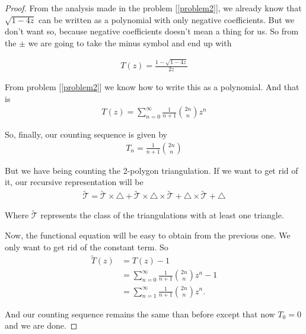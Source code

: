 \begin{proof}
    From the analysis made in the problem [\ref{problem2}], we already know that $\sqrt{1 - 4z}$ can be written as a polynomial with only
    negative coefficients. But we don't want so, because negative coefficients doesn't mean a thing for us. So from the $\pm$ we are going to
    take the minus symbol and end up with
    
    \begin{align}
        T(z) = \frac{1 - \sqrt{1 - 4z}}{2z}    
    \end{align}\pn
    
    From problem [\ref{problem2}] we know how to write this as a polynomial. And that is
    \begin{align}
            T(z) = \sum_{n=0}^{\infty} \frac{1}{n+1} \binom{2n}{n} z^n
    \end{align}\pn
    
    So, finally, our counting sequence is given by
    \begin{align}
            T_n = \frac{1}{n+1} \binom{2n}{n}
    \end{align}\pn
    
    But we have being counting the 2-polygon triangulation. If we want to get rid of it, our recursive representation will be
    \begin{align}
        \tilde{\mathcal{T}} = \tilde{\mathcal{T}} \times \triangle + \tilde{\mathcal{T}} \times \triangle \times \tilde{\mathcal{T}} + \triangle \times \tilde{\mathcal{T}} + \triangle
    \end{align}\pn
    
    Where $\tilde{\mathcal{T}}$ represents the class of the triangulations with at least one triangle.\pn
    
    Now, the functional equation will be easy to obtain from the previous one. We only want to get rid of the constant term. So
    \begin{align}
        \tilde{T}(z)    &=  T(z)-1  \\
                        &=  \sum_{n=0}^{\infty} \frac{1}{n+1} \binom{2n}{n} z^n - 1 \\
                        &=  \sum_{n=1}^{\infty} \frac{1}{n+1} \binom{2n}{n} z^n. 
    \end{align}\pn
    
    And our counting sequence remains the same than before except that now $T_0 = 0$ and we are done.
\end{proof}